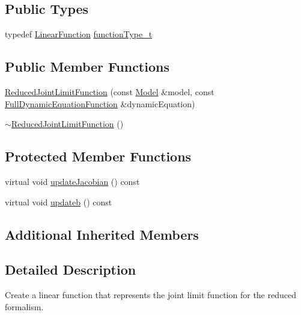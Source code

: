 \subsection*{Public Types}
\begin{DoxyCompactItemize}
\item 
typedef \hyperlink{classocra_1_1LinearFunction}{Linear\+Function} \hyperlink{classocra_1_1ReducedJointLimitFunction_a899e4871502f5e5509349b1f8eb5dfa8}{function\+Type\+\_\+t}
\end{DoxyCompactItemize}
\subsection*{Public Member Functions}
\begin{DoxyCompactItemize}
\item 
\hyperlink{classocra_1_1ReducedJointLimitFunction_afe65f4b9229680de647bb06fd7ae5b44}{Reduced\+Joint\+Limit\+Function} (const \hyperlink{classocra_1_1Model}{Model} \&model, const \hyperlink{classocra_1_1FullDynamicEquationFunction}{Full\+Dynamic\+Equation\+Function} \&dynamic\+Equation)
\item 
\hyperlink{classocra_1_1ReducedJointLimitFunction_a96e9196a18c5eb5e92672b45a7491c65}{$\sim$\+Reduced\+Joint\+Limit\+Function} ()
\end{DoxyCompactItemize}
\subsection*{Protected Member Functions}
\begin{DoxyCompactItemize}
\item 
virtual void \hyperlink{classocra_1_1ReducedJointLimitFunction_a3b2b65be504eda131ad8d00304304fd3}{update\+Jacobian} () const
\item 
virtual void \hyperlink{classocra_1_1ReducedJointLimitFunction_aaf30e3ac7c3053707a04a147b545126c}{updateb} () const
\end{DoxyCompactItemize}
\subsection*{Additional Inherited Members}


\subsection{Detailed Description}
Create a linear function that represents the joint limit function for the reduced formalism. 

